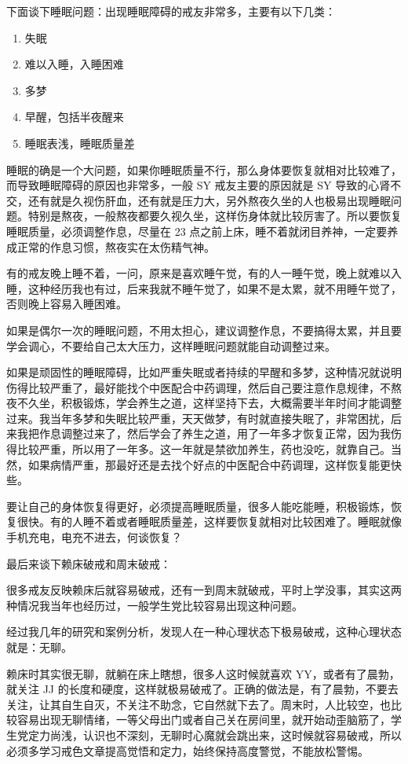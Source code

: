 \documentclass[fontset=founder]{ctexart}
\begin{document}
下面谈下睡眠问题：出现睡眠障碍的戒友非常多，主要有以下几类：

\begin{enumerate}
    \item 失眠
    \item 难以入睡，入睡困难
    \item 多梦
    \item 早醒，包括半夜醒来
    \item 睡眠表浅，睡眠质量差
\end{enumerate}

睡眠的确是一个大问题，如果你睡眠质量不行，那么身体要恢复就相对比较难了，而导致睡眠障碍的原因也非常多，一般 SY 戒友主要的原因就是 SY 导致的心肾不交，还有就是久视伤肝血，还有就是压力大，另外熬夜久坐的人也极易出现睡眠问题。特别是熬夜，一般熬夜都要久视久坐，这样伤身体就比较厉害了。所以要恢复睡眠质量，必须调整作息，尽量在 23 点之前上床，睡不着就闭目养神，一定要养成正常的作息习惯，熬夜实在太伤精气神。

有的戒友晚上睡不着，一问，原来是喜欢睡午觉，有的人一睡午觉，晚上就难以入睡，这种经历我也有过，后来我就不睡午觉了，如果不是太累，就不用睡午觉了，否则晚上容易入睡困难。

如果是偶尔一次的睡眠问题，不用太担心，建议调整作息，不要搞得太累，并且要学会调心，不要给自己太大压力，这样睡眠问题就能自动调整过来。

如果是顽固性的睡眠障碍，比如严重失眠或者持续的早醒和多梦，这种情况就说明伤得比较严重了，最好能找个中医配合中药调理，然后自己要注意作息规律，不熬夜不久坐，积极锻炼，学会养生之道，这样坚持下去，大概需要半年时间才能调整过来。我当年多梦和失眠比较严重，天天做梦，有时就直接失眠了，非常困扰，后来我把作息调整过来了，然后学会了养生之道，用了一年多才恢复正常，因为我伤得比较严重，所以用了一年多。这一年就是禁欲加养生，药也没吃，就靠自己。当然，如果病情严重，那最好还是去找个好点的中医配合中药调理，这样恢复能更快些。

要让自己的身体恢复得更好，必须提高睡眠质量，很多人能吃能睡，积极锻炼，恢复很快。有的人睡不着或者睡眠质量差，这样要恢复就相对比较困难了。睡眠就像手机充电，电充不进去，何谈恢复？

最后来谈下赖床破戒和周末破戒：

很多戒友反映赖床后就容易破戒，还有一到周末就破戒，平时上学没事，其实这两种情况我当年也经历过，一般学生党比较容易出现这种问题。

经过我几年的研究和案例分析，发现人在一种心理状态下极易破戒，这种心理状态就是：无聊。

赖床时其实很无聊，就躺在床上瞎想，很多人这时候就喜欢 YY，或者有了晨勃，就关注 JJ 的长度和硬度，这样就极易破戒了。正确的做法是，有了晨勃，不要去关注，让其自生自灭，不关注不助念，它自然就下去了。周末时，人比较空，也比较容易出现无聊情绪，一等父母出门或者自己关在房间里，就开始动歪脑筋了，学生党定力尚浅，认识也不深刻，无聊时心魔就会跳出来，这时候就容易破戒，所以必须多学习戒色文章提高觉悟和定力，始终保持高度警觉，不能放松警惕。
\end{document}
